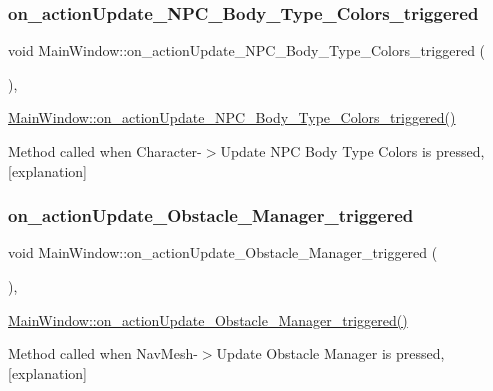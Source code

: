 \subsubsection{\texorpdfstring{on\+\_\+action\+Update\+\_\+\+N\+P\+C\+\_\+\+Body\+\_\+\+Type\+\_\+\+Colors\+\_\+triggered}{on\_actionUpdate\_NPC\_Body\_Type\_Colors\_triggered}}
{\footnotesize\ttfamily void Main\+Window\+::on\+\_\+action\+Update\+\_\+\+N\+P\+C\+\_\+\+Body\+\_\+\+Type\+\_\+\+Colors\+\_\+triggered (\begin{DoxyParamCaption}{ }\end{DoxyParamCaption})\hspace{0.3cm}{\ttfamily [private]}, {\ttfamily [slot]}}



\hyperlink{class_main_window_a9519746e9ca51688b9e8ba99e418739e}{Main\+Window\+::on\+\_\+action\+Update\+\_\+\+N\+P\+C\+\_\+\+Body\+\_\+\+Type\+\_\+\+Colors\+\_\+triggered()} 

Method called when Character-\/$>$Update N\+PC Body Type Colors is pressed, \mbox{[}explanation\mbox{]} \mbox{\label{class_main_window_aa55570f1424f04c029ac0ccdb5c49674}} 
\subsubsection{\texorpdfstring{on\+\_\+action\+Update\+\_\+\+Obstacle\+\_\+\+Manager\+\_\+triggered}{on\_actionUpdate\_Obstacle\_Manager\_triggered}}
{\footnotesize\ttfamily void Main\+Window\+::on\+\_\+action\+Update\+\_\+\+Obstacle\+\_\+\+Manager\+\_\+triggered (\begin{DoxyParamCaption}{ }\end{DoxyParamCaption})\hspace{0.3cm}{\ttfamily [private]}, {\ttfamily [slot]}}



\hyperlink{class_main_window_aa55570f1424f04c029ac0ccdb5c49674}{Main\+Window\+::on\+\_\+action\+Update\+\_\+\+Obstacle\+\_\+\+Manager\+\_\+triggered()} 

Method called when Nav\+Mesh-\/$>$Update Obstacle Manager is pressed, \mbox{[}explanation\mbox{]} \mbox{\label{class_main_window_a3e35b065b22cbe720c98787325b348c9}} 
